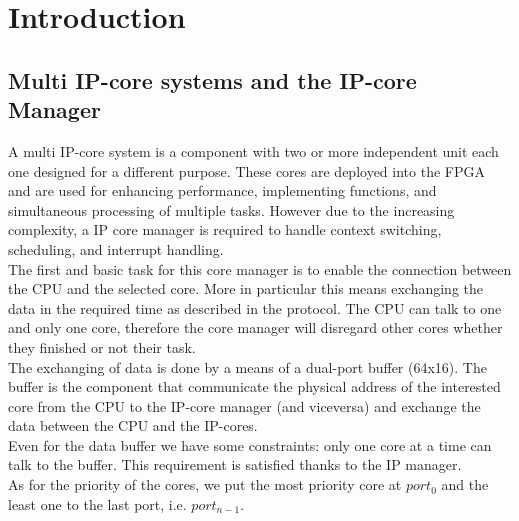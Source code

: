 %
\chapter{Introduction}
\label{chap0}


\section{Multi IP-core systems and the IP-core Manager}
A multi IP-core system is a component with two or more independent unit each one designed for a different purpose. 
These cores are deployed into the FPGA and are used for enhancing performance, implementing functions, and simultaneous processing of multiple tasks.
However due to the increasing complexity, a IP core manager is required to handle context switching, scheduling, and interrupt handling.\\
The first and basic task for this core manager is to enable the connection between the CPU and the selected core. More in particular this means exchanging the data in the required time as described in the protocol. The CPU can talk to one and only one core, therefore the core manager will disregard other cores whether they finished or not their task.\\
The exchanging of data is done by a means of a dual-port buffer (64x16).
The buffer is the component that communicate the physical address of the interested core from the CPU to the IP-core manager (and viceversa) and exchange the data between the CPU and the IP-cores. \\
Even for the data buffer we have some constraints: only one core at a time can talk to the buffer. This requirement is satisfied thanks to the IP manager.\\
As for the priority of the cores, we put the most priority core at $ port_{0} $ and the least one to the last port, i.e. $ port_{n-1} $.